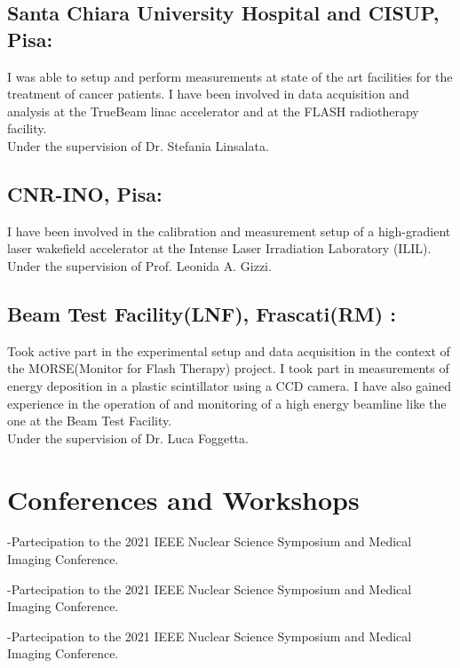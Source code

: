 \documentclass[11pt,letterpaper]{report}
\newcommand{\listitemspace}{0.25em}
\renewenvironment{itemize}
{\begin{list}{}{\setlength{\leftmargin}{0em}
                \setlength{\parskip}{0em}
                \setlength{\itemsep}{\listitemspace}
                \setlength{\parsep}{\listitemspace}}}
{\end{list}}
\begin{document}
    \subsection*{Santa Chiara University Hospital and CISUP, Pisa:}
    I was able to setup and perform measurements at state of the art facilities
    for the treatment of cancer patients. I have been involved in data 
    acquisition and analysis at the TrueBeam linac accelerator and at the
    FLASH radiotherapy facility.\\ Under the supervision of Dr. Stefania Linsalata.
    \subsection*{CNR-INO, Pisa:} I have been involved in the calibration 
    and measurement setup of a high-gradient laser wakefield accelerator at the Intense Laser Irradiation Laboratory (ILIL).
    \\Under the supervision of Prof. Leonida A. Gizzi.
    \subsection*{Beam Test Facility(LNF), Frascati(RM) :}Took active part
    in the experimental setup and data acquisition in the context of the MORSE(Monitor for Flash Therapy)
    project. I took part in measurements of energy deposition in a plastic scintillator
    using a CCD camera. I have also gained experience in the operation of and monitoring
    of a high energy beamline like the one at the Beam Test Facility.
    \\Under the supervision of Dr. Luca Foggetta.

    \section*{Conferences and Workshops}
    \begin{itemize}
        \item -Partecipation to the 2021 IEEE Nuclear Science Symposium and Medical Imaging Conference.
        \item -Partecipation to the 2021 IEEE Nuclear Science Symposium and Medical Imaging Conference.
        \item -Partecipation to the 2021 IEEE Nuclear Science Symposium and Medical Imaging Conference.
    \end{itemize}
\end{document}
